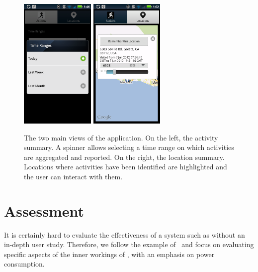 \documentclass{acm_proc_article-sp}
\begin{document}
\begin{figure}
\begin{center}
\includegraphics[height=2.5in]{ranges}
\includegraphics[height=2.5in]{map1}
\caption{
The two main views of the application. On the left, the activity summary. A spinner allows selecting a time range on which activities are aggregated and reported. On the right, the location summary. Locations where activities have been identified are highlighted and the user can interact with them.
}
\label{figure:voice}
\end{center}
\end{figure}


\section{Assessment}

It is certainly hard to evaluate the effectiveness of a system such as \LS without an in-depth user study. Therefore, we follow the example of~\cite{lee2012mobicon} and focus on evaluating specific aspects of the inner workings of \LS, with an emphasis on power consumption.
\end{document}
